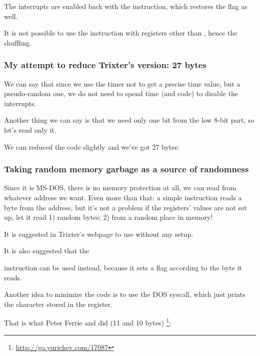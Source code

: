 The interrupts are enabled back with the  instruction, which restores the  flag as well.

It is not possible to 
use the  instruction with registers other than , 
hence the shuffling.

\subsubsection{
My attempt to reduce Trixter's version: 27 bytes}

We can say that since we use the timer not 
to get a precise time value, but a pseudo-random one, we do not need
to spend time (and code) to disable the interrupts.

Another thing we can say is that we need only one bit from the low 8-bit part, so let's read only it.

We can reduced the code slightly and we've got 27 bytes:



\subsubsection{
Taking random memory garbage as a source of randomness}

Since it is MS-DOS, there is no memory protection at all, we can read from whatever address we want.
Even more than that: a simple  
instruction reads a byte from the  address, but it's not a problem
if the registers' values are not set up, let it read 1) random bytes; 2) from a random place in memory!

It is suggested in Trixter's webpage\FNURLTRIXTER 
to use  without any setup.

It is also suggested that the  

instruction can be used instead, because it sets a flag according to the byte it reads.


Another idea to minimize the code is to use the  DOS syscall, which just prints the character stored in the  register.

That is what Peter Ferrie and \HERMIT{} did (11 and 10 bytes)
\footnote{\url{http://go.yurichev.com/17087}}:



